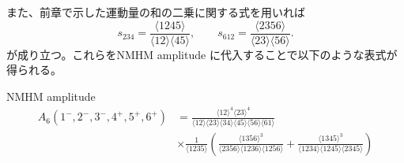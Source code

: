 \documentclass[uplatex,dvipdfmx,a4paper,11pt]{jsarticle}
\numberwithin{equation}{section}
\begin{document}
また、前章で示した運動量の和の二乗に関する式を用いれば
\[
s_{234}
=
\frac{\langle1245\rangle}
{\langle12\rangle\langle45\rangle},
\qquad
s_{612}
=
\frac{\langle2356\rangle}
{\langle23\rangle\langle56\rangle}.
\]
が成り立つ。これらをNMHM amplitude に代入することで以下のような表式が得られる。
\begin{mythm}{NMHM amplitude}
\begin{equation}
  \begin{aligned}
A_6(1^-,2^-,3^-,4^+,5^+,6^+)
&=
\frac{
\langle12\rangle^4\langle23\rangle^4
}{
\langle12\rangle\langle23\rangle
\langle34\rangle\langle45\rangle
\langle56\rangle\langle61\rangle
}\\
&\times
\frac{1}{\langle1235\rangle}
\left(
\frac{
\langle1356\rangle^3
}{
\langle2356\rangle
\langle1236\rangle
\langle1256\rangle
}
+
\frac{
\langle1345\rangle^3
}{
\langle1234\rangle
\langle1245\rangle
\langle2345\rangle
}
\right)
  \end{aligned}
\end{equation}
\end{mythm}
\end{document}
